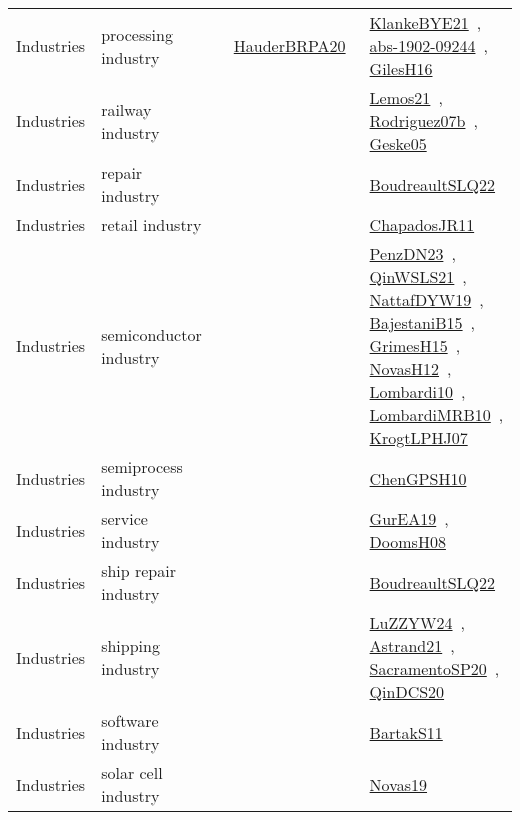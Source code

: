{\begin{longtable}{lp{3cm}>{\raggedright\arraybackslash}p{6cm}>{\raggedright\arraybackslash}p{6cm}>{\raggedright\arraybackslash}p{8cm}}
Industries & processing industry &  & \href{../works/HauderBRPA20.pdf}{HauderBRPA20}~\cite{HauderBRPA20} & \href{../works/KlankeBYE21.pdf}{KlankeBYE21}~\cite{KlankeBYE21}, \href{../works/abs-1902-09244.pdf}{abs-1902-09244}~\cite{abs-1902-09244}, \href{../works/GilesH16.pdf}{GilesH16}~\cite{GilesH16}\\
Industries & railway industry &  &  & \href{../works/Lemos21.pdf}{Lemos21}~\cite{Lemos21}, \href{../works/Rodriguez07b.pdf}{Rodriguez07b}~\cite{Rodriguez07b}, \href{../works/Geske05.pdf}{Geske05}~\cite{Geske05}\\
Industries & repair industry &  &  & \href{../works/BoudreaultSLQ22.pdf}{BoudreaultSLQ22}~\cite{BoudreaultSLQ22}\\
Industries & retail industry &  &  & \href{../works/ChapadosJR11.pdf}{ChapadosJR11}~\cite{ChapadosJR11}\\
Industries & semiconductor industry &  &  & \href{../works/PenzDN23.pdf}{PenzDN23}~\cite{PenzDN23}, \href{../works/QinWSLS21.pdf}{QinWSLS21}~\cite{QinWSLS21}, \href{../works/NattafDYW19.pdf}{NattafDYW19}~\cite{NattafDYW19}, \href{../works/BajestaniB15.pdf}{BajestaniB15}~\cite{BajestaniB15}, \href{../works/GrimesH15.pdf}{GrimesH15}~\cite{GrimesH15}, \href{../works/NovasH12.pdf}{NovasH12}~\cite{NovasH12}, \href{../works/Lombardi10.pdf}{Lombardi10}~\cite{Lombardi10}, \href{../works/LombardiMRB10.pdf}{LombardiMRB10}~\cite{LombardiMRB10}, \href{../works/KrogtLPHJ07.pdf}{KrogtLPHJ07}~\cite{KrogtLPHJ07}\\
Industries & semiprocess industry &  &  & \href{../works/ChenGPSH10.pdf}{ChenGPSH10}~\cite{ChenGPSH10}\\
Industries & service industry &  &  & \href{../works/GurEA19.pdf}{GurEA19}~\cite{GurEA19}, \href{../works/DoomsH08.pdf}{DoomsH08}~\cite{DoomsH08}\\
Industries & ship repair industry &  &  & \href{../works/BoudreaultSLQ22.pdf}{BoudreaultSLQ22}~\cite{BoudreaultSLQ22}\\
Industries & shipping industry &  &  & \href{../works/LuZZYW24.pdf}{LuZZYW24}~\cite{LuZZYW24}, \href{../works/Astrand21.pdf}{Astrand21}~\cite{Astrand21}, \href{../works/SacramentoSP20.pdf}{SacramentoSP20}~\cite{SacramentoSP20}, \href{../works/QinDCS20.pdf}{QinDCS20}~\cite{QinDCS20}\\
Industries & software industry &  &  & \href{../works/BartakS11.pdf}{BartakS11}~\cite{BartakS11}\\
Industries & solar cell industry &  &  & \href{../works/Novas19.pdf}{Novas19}~\cite{Novas19}\\

\end{longtable}}
